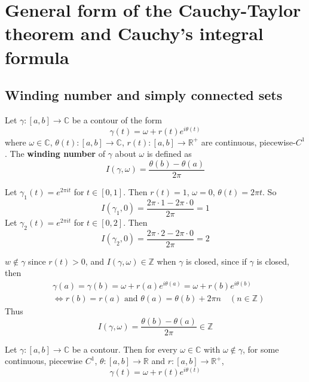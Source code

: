 \section{General form of the Cauchy-Taylor theorem and Cauchy's integral formula}

\subsection{Winding number and simply connected sets}

\begin{definition}
	Let $\gamma: [a, b] \rightarrow \mathbb{C}$ be a contour of the form
	\[
		\gamma(t) = \omega + r(t) e^{i \theta (t)}
	\]
	where $\omega \in \mathbb{C}$, $\theta(t): [a, b] \rightarrow \mathbb{C}$, $r(t): [a, b] \rightarrow \mathbb{R}^+$ are continuous, piecewise-$C^1$. The \textbf{winding number} of $\gamma$ about $\omega$ is defined as
	\[
		I(\gamma, \omega) = \frac{\theta(b) - \theta(a)}{2 \pi}
	\]
\end{definition}

\begin{example}
	Let $\gamma_1(t) = e^{2 \pi i t}$ for $t \in [0, 1]$. Then $r(t) = 1$, $\omega = 0$, $\theta(t) = 2 \pi t$. So
	\[
		I(\gamma_1, 0) = \frac{2 \pi \cdot 1 - 2 \pi \cdot 0}{2 \pi} = 1
	\]
	Let $\gamma_2(t) = e^{2 \pi i t}$ for $t \in [0, 2]$. Then
	\[
		I(\gamma_2, 0) = \frac{2 \pi \cdot 2 - 2 \pi \cdot 0}{2 \pi} = 2
	\]
\end{example}

\begin{remark}
	$w \notin \gamma$ since $r(t) > 0$, and $I(\gamma, \omega) \in \mathbb{Z}$ when $\gamma$ is closed, since if $\gamma$ is closed, then
	\[
		\begin{aligned}
			& \gamma(a) = \gamma(b) = \omega + r(a) e^{i \theta(a)} = \omega + r(b) e^{i \theta(b)} \\
			& \Longleftrightarrow r(b) = r(a) \text{ and } \theta(a) = \theta(b) + 2 \pi n \quad (n \in \mathbb{Z})	
		\end{aligned}
	\]
	Thus
	\[
		I(\gamma, \omega) = \frac{\theta(b) - \theta(a)}{2 \pi} \in \mathbb{Z}
	\]
\end{remark}

\begin{theorem}
	Let $\gamma: [a, b] \rightarrow \mathbb{C}$ be a contour. Then for every $\omega \in \mathbb{C}$ with $\omega \notin \gamma$, for some continuous, piecewise $C^1$, $\theta: [a, b] \rightarrow \mathbb{R}$ and $r: [a, b] \rightarrow \mathbb{R}^+$,
	\[
		\gamma(t) = \omega + r(t) e^{i \theta(t)}
	\]
\end{theorem}

